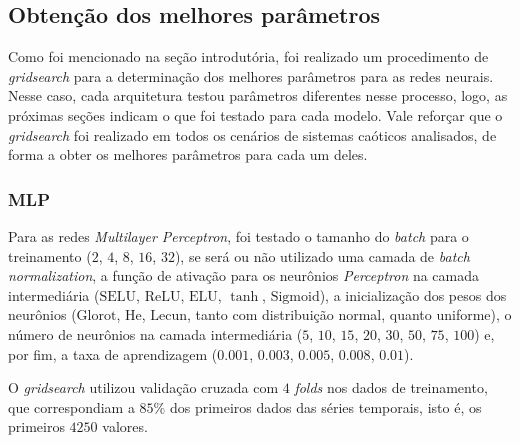 \documentclass[10pt, technote]{article}
\newcommand{\sigmoid}{\text{Sigmoid}}
\newcommand{\selu}{\text{SELU}}
\newcommand{\relu}{\text{ReLU}}
\newcommand{\elu}{\text{ELU}}
\newcommand{\lecun}{\text{Lecun}}
\newcommand{\he}{\text{He}}
\newcommand{\glorot}{\text{Glorot}}
\begin{document}
\subsection{Obtenção dos melhores parâmetros}

Como foi mencionado na seção introdutória, foi realizado um procedimento de \textit{gridsearch} para a determinação dos melhores parâmetros para as redes neurais. Nesse caso, cada arquitetura testou parâmetros diferentes nesse processo, logo, as próximas seções indicam o que foi testado para cada modelo. Vale reforçar que o \textit{gridsearch} foi realizado em todos os cenários de sistemas caóticos analisados, de forma a obter os melhores parâmetros para cada um deles.

\subsubsection{MLP}

Para as redes \textit{Multilayer Perceptron}, foi testado o tamanho do \textit{batch} para o treinamento ($2$, $4$, $8$, $16$, $32$), se será ou não utilizado uma camada de \textit{batch normalization}, a função de ativação para os neurônios \textit{Perceptron} na camada intermediária ($\selu$, $\relu$, $\elu$, $\tanh$, $\sigmoid$), a inicialização dos pesos dos neurônios ($\glorot$, $\he$, $\lecun$, tanto com distribuição normal, quanto uniforme), o número de neurônios na camada intermediária ($5$, $10$, $15$, $20$, $30$, $50$, $75$, $100$) e, por fim, a taxa de aprendizagem ($0.001$, $0.003$, $0.005$, $0.008$, $0.01$). 

O \textit{gridsearch} utilizou validação cruzada com $4$ \textit{folds} nos dados de treinamento, que correspondiam a $85\%$ dos primeiros dados das séries temporais, isto é, os primeiros $4250$ valores.
\end{document}
